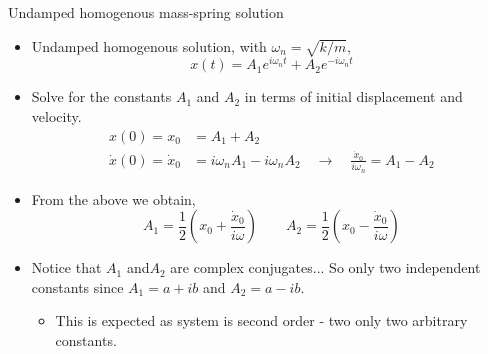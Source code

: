 \documentclass[11pt,aspectratio=169,handout]{beamer}
\begin{document}
\begin{frame}[c]{Undamped homogenous mass-spring solution}
	\begin{itemize}
		\item<1-> Undamped homogenous solution, with $\omega_n = \sqrt{k/m}$,
		\begin{equation}
			x(t) = A_1 e^{i\omega_n t} + A_2 e^{-i\omega_n t}
		\end{equation}
		\item<2-> Solve for the constants $A_1$ and $A_2$ in terms of initial displacement and velocity.
		\begin{align}
			x(0) = x_0 &= A_1 + A_2\\
			\dot{x}(0) = \dot{x}_0 &= i\omega_n A_1 -i\omega_n A_2 \quad\rightarrow\quad  \frac{\dot{x}_0}{i\omega_n} = A_1-A_2
		\end{align} 
	\item<3-> From the above we obtain, 
	\begin{equation}
		A_1 = \frac{1}{2}\left(x_0 +\frac{\dot{x}_0}{i\omega}\right) \quad \quad A_2 = \frac{1}{2}\left(x_0 -\frac{\dot{x}_0}{i \omega}\right)
	\end{equation}
	\item<3-> Notice that $A_1$ and$A_2$ are complex conjugates... So only two independent constants since $A_1 = a+ib$ and $A_2=a-ib$.
	\begin{itemize}
		\item[-] This is expected as system is second order - two only two arbitrary constants.
	\end{itemize} 
	\end{itemize}
\end{frame}
\end{document}
